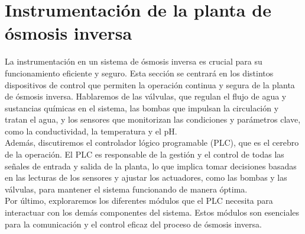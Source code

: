 \section{Instrumentación de la planta de ósmosis inversa}


La instrumentación en un sistema de ósmosis inversa es crucial para su funcionamiento eficiente y seguro. Esta sección se centrará en los distintos dispositivos de control que permiten la operación continua y segura de la planta de ósmosis inversa. Hablaremos de las válvulas, que regulan el flujo de agua y sustancias químicas en el sistema, las bombas que impulsan la circulación y tratan el agua, y los sensores que monitorizan las condiciones y parámetros clave, como la conductividad, la temperatura y el pH.\\

Además, discutiremos el controlador lógico programable (PLC), que es el cerebro de la operación. El PLC es responsable de la gestión y el control de todas las señales de entrada y salida de la planta, lo que implica tomar decisiones basadas en las lecturas de los sensores y ajustar los actuadores, como las bombas y las válvulas, para mantener el sistema funcionando de manera óptima.\\

Por último, exploraremos los diferentes módulos que el PLC necesita para interactuar con los demás componentes del sistema. Estos módulos son esenciales para la comunicación y el control eficaz del proceso de ósmosis inversa.\\







